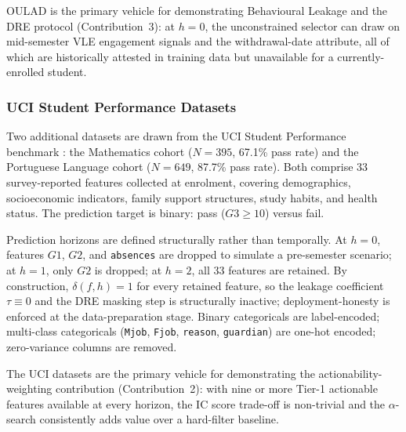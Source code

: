 \documentclass[a4paper,fleqn]{cas-sc}
\begin{document}
OULAD is the primary vehicle for demonstrating Behavioural Leakage and the DRE protocol (Contribution~3): at $h=0$, the unconstrained selector can draw on mid-semester VLE engagement signals and the withdrawal-date attribute, all of which are historically attested in training data but unavailable for a currently-enrolled student.
 
\subsubsection{UCI Student Performance Datasets}
 
Two additional datasets are drawn from the UCI Student Performance benchmark \citep{cortez2008}: the Mathematics cohort ($N=395$, 67.1\% pass rate) and the Portuguese Language cohort ($N=649$, 87.7\% pass rate).
Both comprise 33 survey-reported features collected at enrolment, covering demographics, socioeconomic indicators, family support structures, study habits, and health status. The prediction target is binary: pass ($G3 \geq 10$) versus fail.
 
Prediction horizons are defined structurally rather than temporally. At $h=0$, features $G1$, $G2$, and \texttt{absences} are dropped to simulate a pre-semester scenario; at $h=1$, only $G2$ is dropped; at $h=2$, all 33 features are retained. By construction, $\delta(f,h)=1$ for every retained feature, so the leakage coefficient $\tau \equiv 0$ and the DRE masking step is structurally inactive; deployment-honesty is enforced at the data-preparation stage. Binary categoricals are label-encoded; multi-class categoricals (\texttt{Mjob}, \texttt{Fjob}, \texttt{reason}, \texttt{guardian}) are one-hot encoded; zero-variance columns are removed.
 
The UCI datasets are the primary vehicle for demonstrating the actionability-weighting contribution (Contribution~2): with nine or more Tier-1 actionable features available at every horizon, the IC score trade-off is non-trivial and the $\alpha$-search consistently adds value over a hard-filter baseline.
 
\end{document}
